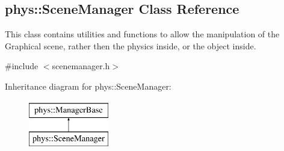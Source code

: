 \hypertarget{classphys_1_1SceneManager}{
\subsection{phys::SceneManager Class Reference}
\label{classphys_1_1SceneManager}
}


This class contains utilities and functions to allow the manipulation of the Graphical scene, rather then the physics inside, or the object inside.  




{\ttfamily \#include $<$scenemanager.h$>$}

Inheritance diagram for phys::SceneManager:\begin{figure}[H]
\begin{center}
\leavevmode
\includegraphics[height=2.000000cm]{classphys_1_1SceneManager}
\end{center}
\end{figure}
